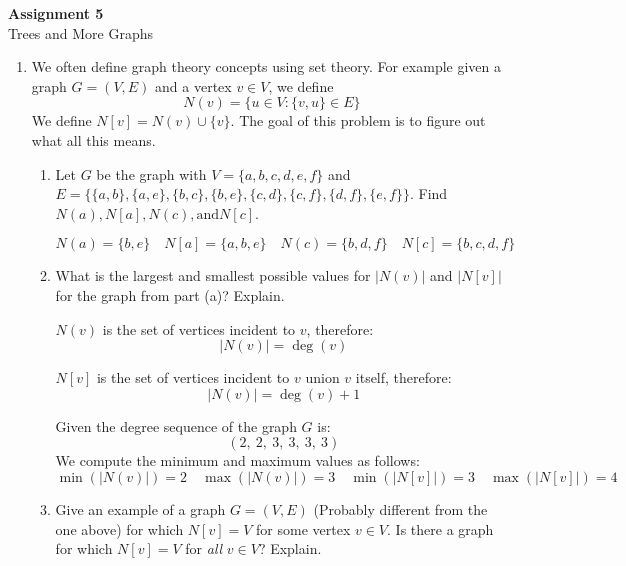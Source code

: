 \documentclass[11pt, letterpaper, includehead]{article}
\theoremstyle{plain}
\theoremstyle{mydefinition}
\theoremstyle{myproperty}
\begin{document}
\pagestyle{fancy}
\fancyhead{}
\fancyfoot{}

\begin{center}
    \Large{\textbf{Assignment 5}}\\
    \Large{Trees and More Graphs}
\end{center}

\begin{enumerate}[label=\textbf{\arabic*}., leftmargin=*]
    \item We often define graph theory concepts using set theory. For example given a graph $G = (V, E)$ and a vertex $v \in V$, we define
    \[N(v) = \{ u \in V : \{v, u \} \in E\} \]
    We define $N[v] = N(v) \cup \{ v\} $. The goal of this problem is to figure out what all this means.

        
    \begin{enumerate}[label=(\alph*)]
        \item Let $G$ be the graph with $V = \{ a,b,c,d,e,f \} $ and
            \\$E = \{  \{ a,b \}, \{ a,e \},\{ b,c \}, \{ b,e \}, \{ c, d\}, \{ c, f\}, \{ d,f \}, \{ e,f \} \} $. 
            Find $N(a), N[a], N(c), \text{and} N[c]$.

                \[N(a) = \{b, e\}   \quad
                N[a] = \{a, b, e\}  \quad
                N(c) = \{b, d, f\}  \quad 
                N[c] = \{b, c, d, f\}\]
        \item What is the largest and smallest possible values for $|N(v)|$ and $|N[v]|$ for the graph from part (a)? Explain.
        
            $N(v)$ is the set of vertices incident to $v$, therefore: 
            \[|N(v)| = \deg(v)\]

            $N[v]$ is the set of vertices incident to $v$ union $v$ itself, therefore: 
            \[|N(v)| = \deg(v) + 1\]

            Given the degree sequence of the graph $G$ is:
            \[
            (2,\ 2,\ 3,\ 3,\ 3,\ 3)
            \]
            We compute the minimum and maximum values as follows:
            \[
            \min(|N(v)|) = 2 \quad \max(|N(v)|) = 3 \quad \min(|N[v]|) = 3 \quad \max(|N[v]|) = 4
            \]

        \item Give an example of a graph $G = (V, E)$ (Probably different from the one above) for which $N[v] = V$ for some vertex $v \in V$. Is there a graph for which $N[v] = V$ for \emph{all} $v \in V$? Explain.
        

\end{enumerate}
\end{enumerate}
\end{document}
